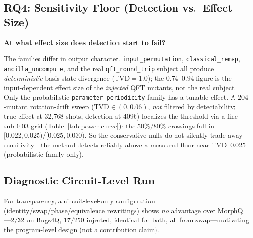 \subsection{RQ4: Sensitivity Floor (Detection vs.\ Effect Size)}

\noindent\textbf{At what effect size does detection start to fail?}

The families differ in output character. \texttt{input\_permutation}, \texttt{classical\_remap}, \texttt{ancilla\_uncompute}, and the real \texttt{qft\_round\_trip} subject all produce \emph{deterministic} basis-state divergence (TVD$=1.0$); the $0.74$--$0.94$ figure is the input-dependent effect size of the \emph{injected} QFT mutants, not the real subject. Only the probabilistic \texttt{parameter\_periodicity} family has a tunable effect. A $204$-mutant rotation-drift sweep (TVD$\in(0,0.06)$, \emph{not} filtered by detectability; true effect at 32{,}768 shots, detection at 4096) localizes the threshold via a fine sub-$0.03$ grid (Table~\ref{tab:power-curve}): the $50\%$/$80\%$ crossings fall in $[0.022,0.025)$/$[0.025,0.030)$. So the conservative nulls do not silently trade away sensitivity---the method detects reliably above a measured floor near TVD~$0.025$ (probabilistic family only).



\subsection{Diagnostic Circuit-Level Run}
\label{sec:diagnostic}

For transparency, a circuit-level-only configuration (identity/swap/phase/equivalence rewritings) shows \emph{no} advantage over MorphQ---$2/32$ on Bugs4Q, $17/250$ injected, identical for both, all from swap---motivating the program-level design (not a contribution claim).
